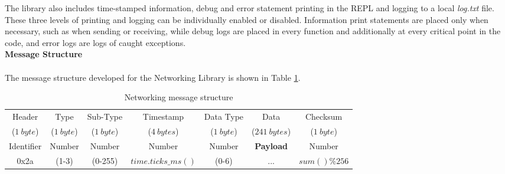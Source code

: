 The library also includes time-stamped information, debug and error statement printing in the REPL and logging to a local \textit{log.txt} file. These three levels of printing and logging can be individually enabled or disabled. Information print statements are placed only when necessary, such as when sending or receiving, while debug logs are placed in every function and additionally at every critical point in the code, and error logs are logs of caught exceptions.\\

\textbf{\label{sec:methods_msg_struct}Message Structure}\\\\
The message structure developed for the Networking Library is shown in Table \ref{tab:msg_struct}. 

\begin{table}[H]
    \centering
    \begin{tabular}{|c|c|c|c|c|c|c|}
        \hline
        Header & Type & Sub-Type  & Timestamp & Data Type & Data & Checksum \\
        ($1\ byte$) & ($1\ byte$) & ($1\ byte$) & ($4\ bytes$) & ($1\ byte$) & ($241\ bytes$) & ($1\ byte$) \\
        \hline
        Identifier & Number & Number & Number & Number & \textbf{Payload} & Number \\
        0x2a & (1-3) & (0-255) & $time.ticks\_ms()$ & (0-6) & ... & $sum() \% 256$ \\
        \hline
    \end{tabular}
    \vspace{\ftspace}
    \caption{Networking message structure}
    \label{tab:msg_struct}
\end{table}

